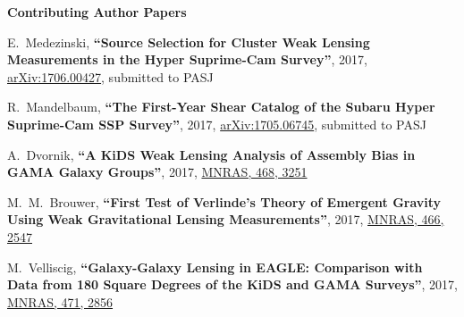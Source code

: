 \documentclass{article}
\def\myself{\textbf{\color{red} C.~Sif\'on}}
\def\mnras{MNRAS}
\def\pasj{PASJ}
\newcommand{\submitted}[1]{submitted to #1}
\newcommand{\paper}[1]{\textbf{``#1''}}
\begin{document}


\vspace{0.4cm}
\noindent
{\bf\Large Contributing Author Papers}\\

\vspace{-0.5cm}
\begin{etaremune}

\item
E.~Medezinski, 
\paper{Source Selection for Cluster Weak Lensing Measurements in the Hyper Suprime-Cam
Survey},
2017, \href{http://adsabs.harvard.edu/abs/2017arXiv170600427M}{arXiv:1706.00427},
\submitted{\pasj}

\item
R.~Mandelbaum, 
\paper{The First-Year Shear Catalog of the Subaru Hyper Suprime-Cam SSP Survey},
2017, \href{http://adsabs.harvard.edu/abs/2017arXiv170506745M}{arXiv:1705.06745},
\submitted{\pasj}

\item
A.~Dvornik, 
\paper{A KiDS Weak Lensing Analysis of Assembly Bias in GAMA Galaxy Groups},
2017, \href{http://adsabs.harvard.edu/abs/2017MNRAS.468.3251D}{\mnras, 468, 3251}

\item
M.~M.~Brouwer, 
\paper{First Test of Verlinde's Theory of Emergent Gravity Using Weak 
Gravitational Lensing Measurements},
2017, \href{http://adsabs.harvard.edu/abs/2017MNRAS.466.2547B}{\mnras, 466, 2547}

\item
M.~Velliscig, 
\paper{Galaxy-Galaxy Lensing in EAGLE: Comparison with Data from 180 Square
Degrees of the KiDS and GAMA Surveys},
2017, \href{http://adsabs.harvard.edu/abs/2017MNRAS.471.2856V}{\mnras, 471, 2856}


\end{etaremune}
\end{document}
